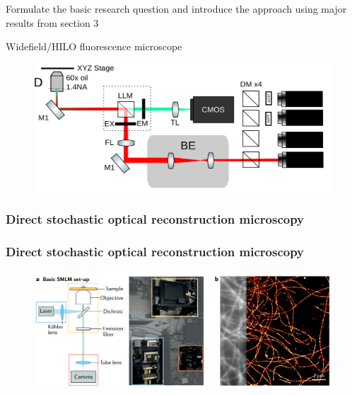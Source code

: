 \documentclass{beamer}					%
\begin{document}
\begin{frame}{}
Formulate the basic research question and introduce the approach using major results from section 3
\end{frame}

\begin{frame}{Widefield/HILO fluorescence microscope}
\begin{figure}
\includegraphics[width=13cm]{Scope2.png}
\end{figure}
\end{frame}

\begin{frame}
\frametitle{Direct stochastic optical reconstruction microscopy}


  
  
\end{frame}

\begin{frame}
\frametitle{Direct stochastic optical reconstruction microscopy}

\begin{figure}
\includegraphics[width=\textwidth]{Setup.png}
\end{figure}
  
\end{frame}
\end{document}
